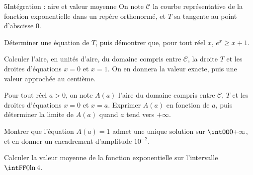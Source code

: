\begin{exoBac}{5}{Intégration : aire et valeur moyenne}
On note $\mathcal{C}$ la courbe représentative de la fonction exponentielle dans un repère orthonormé, et $T$ sa tangente au point
d'abscisse $0$.
\begin{questions}
  \item Déterminer une équation de $T$, puis démontrer que, pour tout réel $x$, $e^{x}\geq x+1$.
  \item Calculer l'aire, en unités d'aire, du domaine compris entre $\mathcal{C}$, la droite $T$ et les droites d'équations $x=0$ et $x=1$.
    On en donnera la valeur exacte, puis une valeur approchée au centième.
  \item Pour tout réel $a>0$, on note $A(a)$ l'aire du domaine compris entre $\mathcal{C}$, $T$ et les droites d'équations $x=0$ et $x=a$.
    Exprimer $A(a)$ en fonction de $a$, puis déterminer la limite de $A(a)$ quand $a$ tend vers $+\infty$.
  \item Montrer que l'équation $A(a)=1$ admet une unique solution sur $\intOO0{+\infty}$, et en donner un encadrement d'amplitude $10^{-2}$.
  \item Calculer la valeur moyenne de la fonction exponentielle sur l'intervalle $\intFF0{\ln4}$.
\end{questions}
\end{exoBac}
